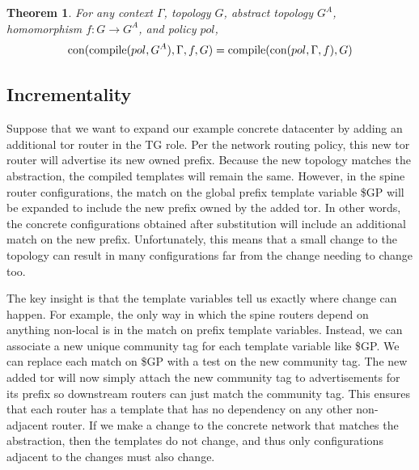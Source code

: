 \documentclass[numbers, 10pt, preprint]{sigplanconf}
\newtheorem{thm}{Theorem}
\begin{document}


\begin{thm}
  For any context $\Gamma$, topology $G$, abstract topology $G^A$, homomorphism $f : G \rightarrow G^A$, and policy $pol$,
  $$\text{con}(\text{compile}(pol,G^A), \Gamma,f,G) = \text{compile}(\text{con}(pol,\Gamma,f),G)$$
\end{thm}

\subsection{Incrementality}

Suppose that we want to expand our example concrete datacenter by adding an additional tor router in the TG role. Per the network routing policy, this new tor router will advertise its new owned prefix. Because the new topology matches the abstraction, the compiled templates will remain the same. However, in the spine router configurations, the match on the global prefix template variable \$GP will be expanded to include the new prefix owned by the added tor. In other words, the concrete configurations obtained after substitution will include an additional match on the new prefix. Unfortunately, this means that a small change to the topology can result in many configurations far from the change needing to change too.

The key insight is that the template variables tell us exactly where change can happen. For example, the only way in which the spine routers depend on anything non-local is in the match on prefix template variables. Instead, we can associate a new unique community tag for each template variable like \$GP. We can replace each match on \$GP with a test on the new community tag. The new added tor will now simply attach the new community tag to advertisements for its prefix so downstream routers can just match the community tag. This ensures that each router has a template that has no dependency on any other non-adjacent router. If we make a change to the concrete network that matches the abstraction, then the templates do not change, and thus only configurations adjacent to the changes must also change.
\end{document}
